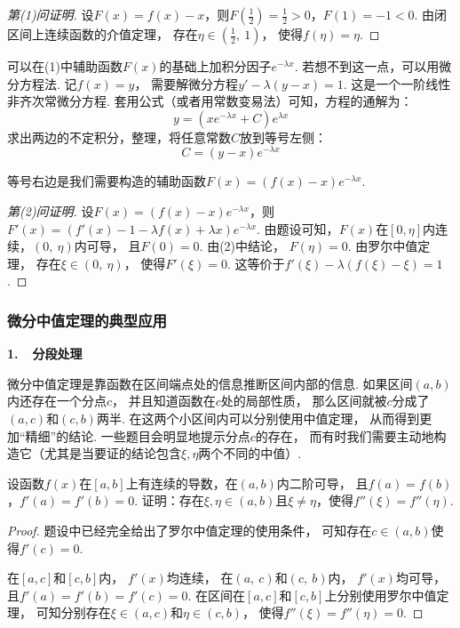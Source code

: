 \begin{proof}[第(1)问证明]
设$F(x) = f(x) - x$，则$F(\frac{1}{2}) = \frac{1}{2}>0$，$F(1) = -1<0$.
由闭区间上连续函数的介值定理，
存在$\eta \in \left(\frac{1}{2},~1\right)$，
使得$f(\eta)=\eta$.
\end{proof}

\begin{analysis}[第(2)问分析]
可以在(1)中辅助函数$F(x)$的基础上加积分因子$e^{-\lambda x}$.
若想不到这一点，可以用微分方程法.
记$f(x) = y$，
需要解微分方程$y'- \lambda (y - x) = 1$.
这是一个一阶线性非齐次常微分方程.
套用公式（或者用常数变易法）可知，方程的通解为：
$$
y = (xe^{-\lambda x}+C)e^{\lambda x}
$$
求出两边的不定积分，整理，将任意常数$C$放到等号左侧：
$$
C = (y-x)e^{- \lambda x}
$$\par
等号右边是我们需要构造的辅助函数$F(x) = (f(x) - x)e^{- \lambda x} $.
\end{analysis}

\begin{proof}[第(2)问证明]
设$F(x) = (f(x) - x)e^{- \lambda x} $，则$F'(x) = (f'(x) -1 - \lambda f(x) + \lambda x)e^{- \lambda x}$.
由题设可知，$F(x)$在$[0,\eta]$内连续，$(0,~\eta)$内可导，
且$F(0) = 0$. 由(2)中结论，
$F(\eta) = 0$.
由罗尔中值定理，
存在$\xi \in (0,~\eta)$，
使得$F'(\xi) = 0$.
这等价于$f'(\xi)-\lambda (f(\xi)-\xi) = 1$.
\end{proof}

\subsubsection{微分中值定理的典型应用}\par

\textbf{1.~~分段处理} \vspace{0.25em}

微分中值定理是靠函数在区间端点处的信息推断区间内部的信息.
如果区间$(a,b)$内还存在一个分点$c$，
并且知道函数在$c$处的局部性质，
那么区间就被$c$分成了$(a,c)$和$(c,b)$两半.
在这两个小区间内可以分别使用中值定理，
从而得到更加“精细”的结论.
一些题目会明显地提示分点$c$的存在，
而有时我们需要主动地构造它（尤其是当要证的结论包含$\xi,\eta$两个不同的中值）.

\begin{example}
\label{ex:ch04-31}
设函数$f(x)$在$[a,b]$上有连续的导数，在$(a,b)$内二阶可导，
且$f(a) = f(b)$，$f'(a) = f'(b) = 0$.
证明：存在$\xi, \eta \in (a,b)$且$\xi \ne \eta$，使得$f''(\xi) = f''(\eta)$.
\end{example}

\begin{proof}
题设中已经完全给出了罗尔中值定理的使用条件，
可知存在$c \in (a,b)$使得$f'(c)=0$.\par
在$[a,c]$和$[c,b]$内，
$f'(x)$均连续，
在$(a,~c)$和$(c,~b)$内，
$f'(x)$均可导，
且$f'(a) = f'(b) = f'(c) = 0$.
在区间在$[a,c]$和$[c,b]$上分别使用罗尔中值定理，
可知分别存在$\xi \in (a,c)$和$\eta \in (c,b)$，
使得$f''(\xi) = f''(\eta) = 0$.
\end{proof}

